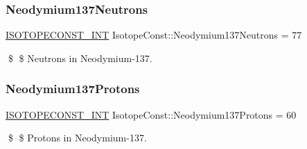 \subsubsection{\texorpdfstring{Neodymium137\+Neutrons}{Neodymium137Neutrons}}
{\footnotesize\ttfamily \mbox{\hyperlink{group___isotope_const-_macros_ga5f18360b3e99483a35c32d789e62621c}{I\+S\+O\+T\+O\+P\+E\+C\+O\+N\+S\+T\+\_\+\+I\+NT}} Isotope\+Const\+::\+Neodymium137\+Neutrons = 77}

\$ \$ Neutrons in Neodymium-\/137. \mbox{\label{group___isotope_const-_neodymium-_nd137_ga3d0424e72a70250b4b05e6ba6eceab98}} 
\subsubsection{\texorpdfstring{Neodymium137\+Protons}{Neodymium137Protons}}
{\footnotesize\ttfamily \mbox{\hyperlink{group___isotope_const-_macros_ga5f18360b3e99483a35c32d789e62621c}{I\+S\+O\+T\+O\+P\+E\+C\+O\+N\+S\+T\+\_\+\+I\+NT}} Isotope\+Const\+::\+Neodymium137\+Protons = 60}

\$ \$ Protons in Neodymium-\/137. 